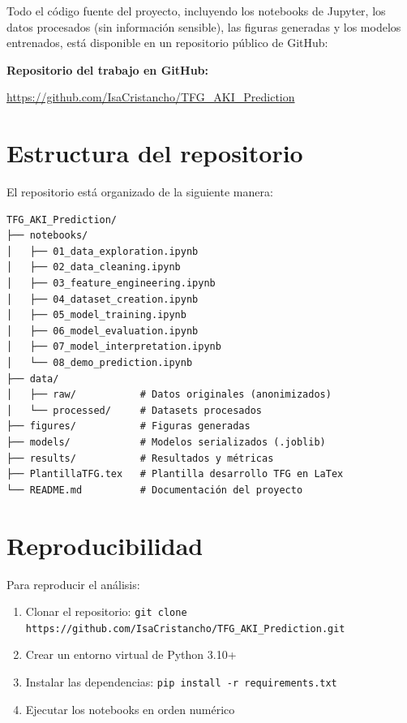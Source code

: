 \documentclass[12pt, a4paper, oneside]{report}
\begin{document}
Todo el código fuente del proyecto, incluyendo los notebooks de Jupyter, los datos procesados (sin información sensible), las figuras generadas y los modelos entrenados, está disponible en un repositorio público de GitHub:

\begin{center}
\large
\textbf{Repositorio del trabajo en GitHub:}

\url{https://github.com/IsaCristancho/TFG_AKI_Prediction}
\end{center}

\section{Estructura del repositorio}

El repositorio está organizado de la siguiente manera:

\begin{verbatim}
TFG_AKI_Prediction/
├── notebooks/
│   ├── 01_data_exploration.ipynb
│   ├── 02_data_cleaning.ipynb
│   ├── 03_feature_engineering.ipynb
│   ├── 04_dataset_creation.ipynb
│   ├── 05_model_training.ipynb
│   ├── 06_model_evaluation.ipynb
│   ├── 07_model_interpretation.ipynb
│   └── 08_demo_prediction.ipynb
├── data/
│   ├── raw/           # Datos originales (anonimizados)
│   └── processed/     # Datasets procesados
├── figures/           # Figuras generadas
├── models/            # Modelos serializados (.joblib)
├── results/           # Resultados y métricas
├── PlantillaTFG.tex   # Plantilla desarrollo TFG en LaTex
└── README.md          # Documentación del proyecto
\end{verbatim}

\section{Reproducibilidad}

Para reproducir el análisis:

\begin{enumerate}
    \item Clonar el repositorio: \texttt{git clone https://github.com/IsaCristancho/TFG\_AKI\_Prediction.git}
    \item Crear un entorno virtual de Python 3.10+
    \item Instalar las dependencias: \texttt{pip install -r requirements.txt}
    \item Ejecutar los notebooks en orden numérico
\end{enumerate}
\end{document}
